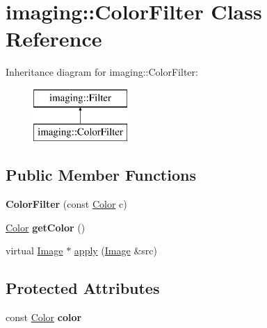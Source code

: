 \hypertarget{classimaging_1_1_color_filter}{}\section{imaging\+:\+:Color\+Filter Class Reference}
\label{classimaging_1_1_color_filter}
Inheritance diagram for imaging\+:\+:Color\+Filter\+:\begin{figure}[H]
\begin{center}
\leavevmode
\includegraphics[height=2.000000cm]{classimaging_1_1_color_filter}
\end{center}
\end{figure}
\subsection*{Public Member Functions}
\begin{DoxyCompactItemize}
\item 
\mbox{\label{classimaging_1_1_color_filter_ad1bb2cc1d2a357166ae3261d542c59d7}} 
{\bfseries Color\+Filter} (const \hyperlink{classmath_1_1_vec3}{Color} c)
\item 
\mbox{\label{classimaging_1_1_color_filter_a9ad91d22ab9cafbfeb767dfef787c7d1}} 
\hyperlink{classmath_1_1_vec3}{Color} {\bfseries get\+Color} ()
\item 
virtual \hyperlink{classimaging_1_1_image}{Image} $\ast$ \hyperlink{classimaging_1_1_color_filter_a38b3f549e53f0d25b56a388350213782}{apply} (\hyperlink{classimaging_1_1_image}{Image} \&src)
\end{DoxyCompactItemize}
\subsection*{Protected Attributes}
\begin{DoxyCompactItemize}
\item 
\mbox{\label{classimaging_1_1_color_filter_a05eee96debffe494d298243812aaf9ee}} 
const \hyperlink{classmath_1_1_vec3}{Color} {\bfseries color}
\end{DoxyCompactItemize}


